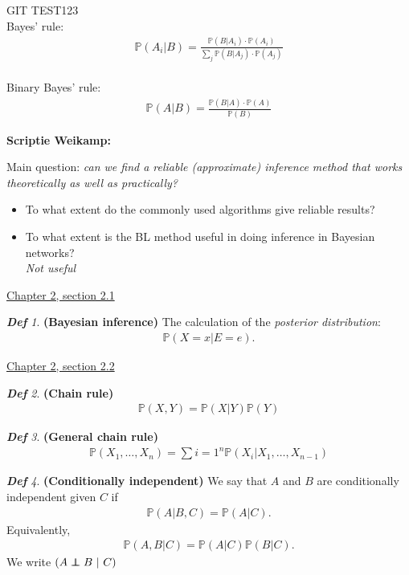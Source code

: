 \documentclass{amsart}
\newcommand\indep{\protect\mathpalette{\protect\independenT}{\perp}}
\def\independenT#1#2{\mathrel{\rlap{$#1#2$}\mkern2mu{#1#2}}}
\theoremstyle{plain}
\theoremstyle{remark}
\newtheorem*{definition*}{\textbf{\em Def}}
\theoremstyle{plain}
\renewcommand{\P}{{\mathbb P}}
\newcommand{\vs}{\vspace{0.75pc}}
\begin{document}
GIT TEST123\\

Bayes' rule:
\begin{align*}
\P(A_i|B) = \frac{\P(B|A_i) \cdot \P(A_i)}{\sum_j \P(B|A_j) \cdot \P(A_j)}
\end{align*}\\
Binary Bayes' rule:
\begin{align*}
\P(A|B) = \frac{\P(B|A) \cdot \P(A)}{ \P(B)}
\end{align*} \vs

\textbf{Scriptie Weikamp:}\vs

Main question: \textit{can we find a reliable (approximate) inference method that works theoretically as well as practically?} \\
\begin{itemize}
\item To what extent do the commonly used algorithms give reliable results?
\item To what extent is the BL method useful in doing inference in Bayesian networks? \\ \textit{Not useful}
\end{itemize}\vs

\underline{Chapter 2, section 2.1} \vs

\begin{definition*}\textbf{(Bayesian inference)}
The calculation of the \textit{posterior distribution}:
\begin{align*}
\P(X = x | E = e).
\end{align*}
\end{definition*}\vs

\underline{Chapter 2, section 2.2} \\
\begin{definition*}\textbf{(Chain rule)}
\begin{align*}
\P(X, Y) = \P(X | Y) \P(Y)
\end{align*}
\end{definition*}\vs

\begin{definition*}\textbf{ (General chain rule) }
\begin{align*}
\P(X_1, \ldots, X_n) = \sum{i=1}^n \P(X_i | X_1, \ldots , X_{n-1})
\end{align*}
\end{definition*}\vs

\begin{definition*}\textbf{(Conditionally independent)}
We say that $A$ and $B$ are conditionally independent given $C$ if
\begin{align*}
\P(A | B,C) = \P(A | C).
\end{align*}
Equivalently,
\begin{align*}
\P(A, B | C) = \P(A | C)\P(B| C).
\end{align*}
We write $(A \indep B\ |\ C)$
\end{definition*}\vs
\end{document}
